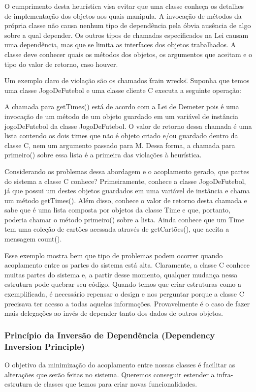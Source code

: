 O cumprimento desta heurística visa evitar que uma classe conheça os detalhes de implementação dos objetos aos quais manipula. A invocação de métodos da própria classe não causa nenhum tipo de dependência pela óbvia ausência de algo sobre a qual depender. Os outros tipos de chamadas especificados na Lei causam uma dependência, mas que se limita as interfaces dos objetos trabalhados. A classe deve conhecer quais os métodos dos objetos, os argumentos que aceitam e o tipo do valor de retorno, caso houver.
	
Um exemplo claro de violação são os chamados \"train wrecks\". Suponha que temos uma classe JogoDeFutebol e uma classe cliente C executa a seguinte operação:
	


A chamada para getTimes() está de acordo com a Lei de Demeter pois é uma invocação de um método de um objeto guardado em um variável de instância jogoDeFutebol da classe JogoDeFutebol. O valor de retorno dessa chamada é uma lista contendo os dois times que não é objeto criado e/ou guardado dentro da classe C, nem um argumento passado para M. Dessa forma, a chamada para primeiro() sobre essa lista é a primeira das violações à heurística.
	
Considerando os problemas dessa abordagem e o acoplamento gerado, que partes do sistema a classe C conhece? Primeiramente, conhece a classe JogoDeFutebol, já que possui um destes objetos guardados em uma variável de instância e chama um método getTimes(). Além disso, conhece o valor de retorno desta chamada e sabe que é uma lista composta por objetos da classe Time e que, portanto, poderia chamar o método primeiro() sobre a lista. Ainda conhece que um Time tem uma coleção de cartões acessada através de getCartões(), que aceita a mensagem count().
	
Esse exemplo mostra bem que tipo de problemas podem ocorrer quando acoplamento entre as partes do sistema está alta. Claramente, a classe C conhece muitas partes do sistema e, a partir desse momento, qualquer mudança nessa estrutura pode quebrar seu código. Quando temos que criar estruturas como a exemplificada, é necessário repensar o design e nos perguntar porque a classe C precisava ter acesso a todas aquelas informações. Provavelmente é o caso de fazer mais delegações ao invés de depender tanto dos dados de outros objetos.

\subsubsection{Princípio da Inversão de Dependência (Dependency Inversion Principle)}
O objetivo da minimização do acoplamento entre nossas classes é facilitar as alterações que serão feitas no sistema. Queremos conseguir estender a infra-estrutura de classes que temos para criar novas funcionalidades.
	
